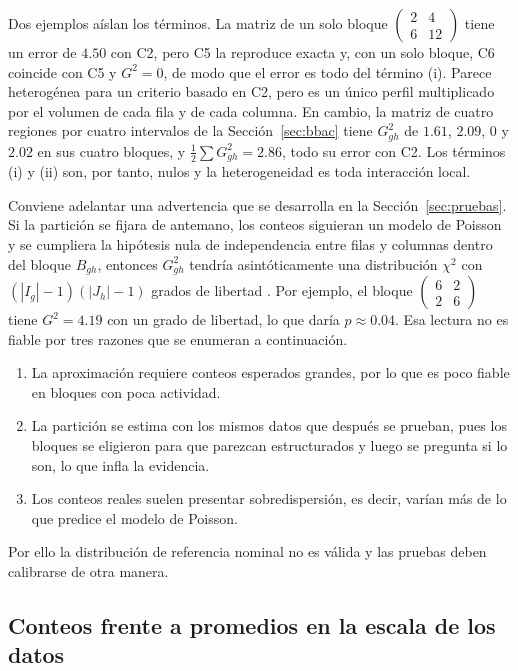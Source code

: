 Dos ejemplos aíslan los términos. La matriz de un solo bloque
$\begin{pmatrix} 2 & 4 \\ 6 & 12 \end{pmatrix}$ tiene un error de $4.50$ con C2,
pero C5 la reproduce exacta y, con un solo bloque, C6 coincide con C5 y
$G^2 = 0$, de modo que el error es todo del término (i). Parece heterogénea para un criterio
basado en C2, pero es un único perfil multiplicado por el volumen de cada fila y
de cada columna. En cambio, la matriz de cuatro regiones por cuatro intervalos de
la Sección~\ref{sec:bbac} tiene $G^2_{gh}$ de $1.61$, $2.09$, $0$ y $2.02$ en sus
cuatro bloques, y $\tfrac12 \sum G^2_{gh} = 2.86$, todo su error con C2. Los
términos (i) y (ii) son, por tanto, nulos y la heterogeneidad es toda
interacción local.

Conviene adelantar una advertencia que se desarrolla en la
Sección~\ref{sec:pruebas}. Si la partición se fijara de antemano, los
conteos siguieran un modelo de Poisson y se cumpliera la hipótesis nula de
independencia entre filas y columnas dentro del bloque $B_{gh}$, entonces
$G^2_{gh}$ tendría asintóticamente una distribución $\chi^2$ con
$(|I_g|-1)(|J_h|-1)$ grados de libertad \citep[Secs.~3.2.1 y~4.5.2]{Agresti2013}.
Por ejemplo, el bloque $\begin{pmatrix} 6 & 2 \\ 2 & 6 \end{pmatrix}$ tiene
$G^2 = 4.19$ con un grado de libertad, lo que daría $p \approx 0.04$. Esa lectura
no es fiable por tres razones que se enumeran a continuación.
\begin{enumerate}
  \item La aproximación requiere conteos esperados grandes, por lo que es poco
        fiable en bloques con poca actividad.
  \item La partición se estima con los mismos datos que después se prueban, pues
        los bloques se eligieron para que parezcan estructurados y luego se
        pregunta si lo son, lo que infla la evidencia.
  \item Los conteos reales suelen presentar sobredispersión, es decir, varían más
        de lo que predice el modelo de Poisson.
\end{enumerate}
Por ello la distribución de referencia nominal no es válida y las pruebas deben
calibrarse de otra manera.

\subsection{Conteos frente a promedios en la escala de los datos}\label{sec:escala}

